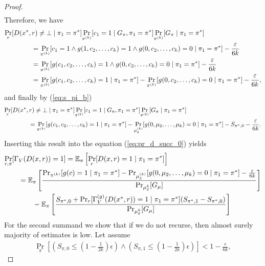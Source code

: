 \begin{proof}
\begin{align}
\end{align}
Therefore, we have
\begin{align*}
  &\underset{r}{\Pr}[D(x^*,r) \neq \bot \mid \pi_1 = \pi^*]
  \underset{\pi^{(k)}}{\Pr}[c_1 = 1 \mid G_{\pi}, \pi_1 = \pi^*]
  \underset{\pi^{(k)}}{\Pr}[G_{\pi} \mid \pi_1 = \pi^*] \notag\\
  &\mbox\qquad\qquad = \underset{\pi^{(k)}}{\Pr}[c_1 = 1 \land g(1, c_2,\dots, c_k) = 1 \land g(0, c_2, \dots, c_k) = 0 \mid \pi_1 = \pi^*] - \frac{\varepsilon}{6k} \\
  &\mbox\qquad\qquad = \underset{\pi^{(k)}}{\Pr}[g(c_1, c_2,\dots, c_k) = 1 \land g(0, c_2, \dots, c_k) = 0 \mid \pi_1 = \pi^*] - \frac{\varepsilon}{6k} \\
  &\mbox\qquad\qquad = \underset{\pi^{(k)}}{\Pr}[g(c_1, c_2,\dots, c_k) = 1 \mid \pi_1 = \pi^*] -  \underset{\pi^{(k)}}{\Pr}[g(0, c_2, \dots, c_k) = 0 \mid \pi_1 = \pi^*] - \frac{\varepsilon}{6k},
\end{align*}
and finally by (\ref{eq:s_pi_b})
\begin{align}
  &\underset{r}{\Pr}[D(x^*,r) \neq \bot \mid \pi_1 = \pi^*]
  \underset{\pi^{(k)}}{\Pr}[c_1 = 1 \mid G_{\pi}, \pi_1 = \pi^*]
  \underset{\pi^{(k)}}{\Pr}[G_{\pi} \mid \pi_1 = \pi^*] \notag\\
  &\mbox\qquad\qquad = \underset{\pi^{(k)}}{\Pr}[g(c_1, c_2,\dots, c_k) = 1 \mid \pi_1 = \pi^*] -  \underset{\mu_{\delta}^{(k)}}{\Pr}[g(0, \mu_2, \dots, \mu_k) = 0 \mid \pi_1 = \pi^*]  - S_{\pi^*,0} - \frac{\varepsilon}{6k}.
\end{align}
Inserting this result into the equation (\ref{eq:pr_d_succ_0}) yields
\begin{align}
\label{eq:pr_d_succ_1}
  &\underset{r,\pi}{\Pr}[\Gamma_V(D(x,r)) = 1] = \mathbb{E_{\pi}}\left[\underset{r}{\Pr}[D(x,r) = 1 \mid \pi_1 = \pi^*]\right] \notag\\
&\mbox\qquad = \mathbb{E}_{\pi}\left[\frac{{\Pr}_{\pi^{(k)}}[g(c) = 1 \mid \pi_1 = \pi^*] -
{\Pr}_{\mu_{\delta}^{(k)}}[g(0, \mu_2, \dots, \mu_k) = 0 \mid \pi_1 = \pi^*] - \frac{\varepsilon}{6k}} {{\Pr}_{\mu_{\delta}^{k}}[G_{\mu}]}\right] \notag\\
&\mbox\qquad\qquad - \mathbb{E}_{\pi}\left[\frac{
  S_{\pi^*,0} + \Pr_r [\Gamma_V^{(g)}(D(x^*,r)) = 1 \mid \pi_1 = \pi^*](S_{\pi^*,1} - S_{\pi^*,0})}
{{\Pr}_{\mu_{\delta}^{k}}[G_{\mu}]}\right]
\end{align}
For the second summand we show that if we do not recurse, then almost surely majority of estimates is low.
Let assume
\begin{align}
\underset{\pi}{\Pr}\left[\left(S_{\pi,0} \leq (1 - \frac{1}{2k})\epsilon\right) \land \left( S_{\pi,1} \leq (1-\frac{1}{2k})\epsilon\right)\right] < 1 - \frac{\epsilon}{6k},

\end{align}
\end{proof}
